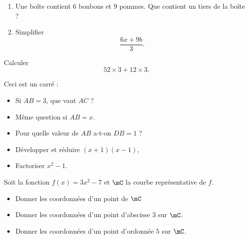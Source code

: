 \begin{MentalActivity}
\begin{mental}
    \begin{enumerate}
        \item
            Une boîte contient \( 6\) bonbons et \( 9\) pommes. Que contient un tiers de la boîte ?
        \item
            Simplifier
            \begin{equation*}
                \frac{ 6x+9b }{ 3 }.
            \end{equation*}
    \end{enumerate}
\end{mental}
            
\end{MentalActivity}


\begin{MentalActivity}

\begin{mental}
    
            Calculer
            \begin{equation*}
                52\times 3+12\times 3.
            \end{equation*}

\end{mental}

\begin{mental}
        Ceci est un carré :

        \begin{center}
   
        \end{center}

        \begin{itemize}
            \item Si \( AB=3\), que vaut \( AC\) ?
            \item Même question si \( AB=x\).
            \item Pour quelle valeur de \( AB\) a-t-on \( DB=1\) ?
        \end{itemize}
\end{mental}

\begin{mental}
        \begin{itemize}
            \item
    Développer et réduire $(x+1)(x-1)$, 
\item
    Factoriser $x^2-1$.
        \end{itemize}
\end{mental}


\begin{mental}
            Soit la fonction \( f(x)=3x^2-7\) et \( \mC\) la courbe représentative de \( f\).
            \begin{itemize}
            \item Donner les coordonnées d'un point de \( \mC\)
            \item Donner les coordonnées d'un point d'abscisse \( 3\) sur \( \mC\).
            \item Donner les coordonnées d'un point d'ordonnée \( 5\) sur \( \mC\).
            \end{itemize}
\end{mental}


\end{MentalActivity}

